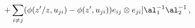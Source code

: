 \begin{equation}
+\sum_{i\neq j} (\phi(z'/z,u_{ji})-\phi(z',u_{ji}))e_{ij}\otimes e_{ji}]
\al^{-1}_1\al^{-1}_2\,,
\label{RMAT}
\end{equation}

